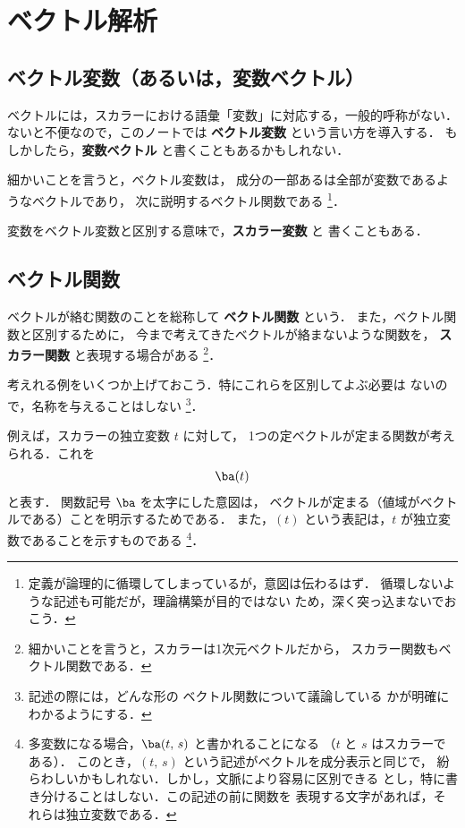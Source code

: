﻿%

    \section{ベクトル解析}
    \subsection{ベクトル変数（あるいは，変数ベクトル）}
    ベクトルには，スカラーにおける語彙「変数」に対応する，一般的呼称がない．
    ないと不便なので，このノートでは \textbf{ベクトル変数} という言い方を導入する．
    もしかしたら，\textbf{変数ベクトル} と書くこともあるかもしれない．

    細かいことを言うと，ベクトル変数は，
    成分の一部あるは全部が変数であるようなベクトルであり，
    次に説明するベクトル関数である
        \footnote{
            定義が論理的に循環してしまっているが，意図は伝わるはず．
            循環しないような記述も可能だが，理論構築が目的ではない
            ため，深く突っ込まないでおこう．
        }．

    変数をベクトル変数と区別する意味で，\textbf{スカラー変数} と
    書くこともある．

    \subsection{ベクトル関数}
    ベクトルが絡む関数のことを総称して \textbf{ベクトル関数} という．
    また，ベクトル関数と区別するために，
    今まで考えてきたベクトルが絡まないような関数を，
    \textbf{スカラー関数} と表現する場合がある
        \footnote{
            細かいことを言うと，スカラーは1次元ベクトルだから，
            スカラー関数もベクトル関数である．
        }．

    考えれる例をいくつか上げておこう．特にこれらを区別してよぶ必要は
    ないので，名称を与えることはしない
        \footnote{
            記述の際には，どんな形の
            ベクトル関数について議論している
            かが明確にわかるようにする．
        }．

    例えば，スカラーの独立変数 $t$ に対して，
    1つの定ベクトルが定まる関数が考えられる．これを
        \begin{align}
            \ba (t)
        \end{align}
    と表す．
    関数記号 $\ba$ を太字にした意図は，
    ベクトルが定まる（値域がベクトルである）ことを明示するためである．
    また，$(t)$ という表記は，$t$ が独立変数であることを示すものである
        \footnote{
            多変数になる場合，$\ba(t,\,s)$ と書かれることになる
            （$t$ と $s$ はスカラーである）．
            このとき，$(t,\,s)$ という記述がベクトルを成分表示と同じで，
            紛らわしいかもしれない．しかし，文脈により容易に区別できる
            とし，特に書き分けることはしない．この記述の前に関数を
            表現する文字があれば，それらは独立変数である．
        }．

